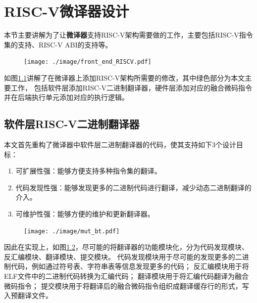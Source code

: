 \chapter{RISC-V微译器设计}\label{chap:RISC-V}

本节主要讲解为了让\textbf{微译器}支持RISC-V架构需要做的工作，主要包括RISC-V指令集的支持、RISC-V ABI的支持等。

\begin{figure}[!htbp]
  \centering
  \texttt{[image: ./image/front\_end\_RISCV.pdf]}
  \label{img:front_end_riscv}
\end{figure}

如图\ref{img:front_end_riscv}讲解了在微译器上添加RISC-V架构所需要的修改，其中绿色部分为本文主要工作，
包括软件层添加RISC-V二进制翻译器，硬件层添加对应的融合微码指令并在后端执行单元添加对应的执行逻辑。

\section{软件层RISC-V二进制翻译器}

本文首先重构了微译器中软件层二进制翻译器的代码，使其支持如下3个设计目标：
\begin{enumerate}
  \item 可扩展性强：能够方便支持多种指令集的翻译。
  \item 代码发现性强：能够发现更多的二进制代码进行翻译，减少动态二进制翻译的介入。
  \item 可维护性强：能够方便的维护和更新翻译器。
\end{enumerate}

\begin{figure}[!htbp]
  \centering
  \texttt{[image: ./image/mut\_bt.pdf]}
  \label{img:mut_bt}
\end{figure}

因此在实现上，如图\ref{img:mut_bt}，尽可能的将翻译器的功能模块化，分为代码发现模块、反汇编模块、翻译模块、提交模块。
代码发现模块用于尽可能的发现更多的二进制代码，例如通过符号表、字符串表等信息发现更多的代码；
反汇编模块用于将ELF文件中的二进制代码转换为汇编代码；
翻译模块用于将汇编代码翻译为融合微码指令；
提交模块用于将翻译后的融合微码指令组织成翻译缓存行的形式，写入预翻译文件。

